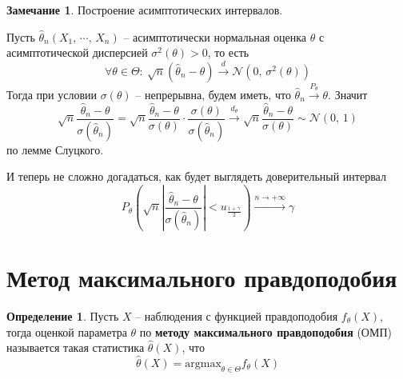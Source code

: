 \documentclass[a4paper,12pt]{article}
\theoremstyle{plain}
\theoremstyle{definition}
\newtheorem{definition}{Определение}[section]
\newtheorem*{note}{Замечание}
\theoremstyle{remark}
\begin{document}
\begin{note}
  Построение асимптотических интервалов.

  Пусть $\hat{\theta}_n(X_1,\,\cdots,\,X_n)$ -- асимптотически нормальная оценка $\theta$ с асимптотической дисперсией $\sigma^2(\theta) > 0$, то есть
  \[
    \forall \theta \in \Theta :\: \sqrt{n}(\hat{\theta}_n - \theta) \overset{d}{\to} \mathcal{N}(0,\, \sigma^2(\theta))
  \]
  Тогда при условии $\sigma(\theta)$ -- непрерывна, будем иметь, что $\hat{\theta}_n \overset{P_\theta}{\to} \theta$. Значит
  \[
    \sqrt{n}\frac{\hat{\theta}_n - \theta}{\sigma(\hat{\theta}_n)} = \sqrt{n}\frac{\hat{\theta}_n - \theta}{\sigma(\theta)} \cdot\frac{\sigma(\theta)}{\sigma(\hat{\theta}_n)} \overset{d_\theta}{\to} \sqrt{n}\frac{\hat{\theta}_n - \theta}{\sigma(\theta)} \sim \mathcal{N}(0,\, 1)
  \]
  по лемме Слуцкого.

  И теперь не сложно догадаться, как будет выглядеть доверительный интервал
  \[
    P_\theta\left(\sqrt{n}\left\vert\frac{\hat{\theta}_n - \theta}{\sigma(\hat{\theta}_n)}\right\vert < u_{\frac{1 + \gamma}{2}}\right) \overset{n \to +\infty}{\to} \gamma
  \]
\end{note}

\section{Метод максимального правдоподобия}
\begin{definition}
  Пусть $X$ -- наблюдения с функцией правдоподобия $f_\theta(X)$, тогда оценкой параметра $\theta$ по \textbf{методу максимального правдоподобия} (ОМП) называется такая статистика $\hat{\theta}(X)$, что
  \[
    \hat{\theta}(X) = \text{argmax}_{\theta \in \Theta}f_\theta(X)
  \]
\end{definition}
\end{document}
